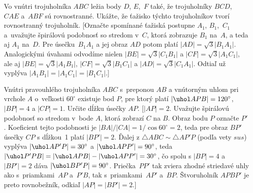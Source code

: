 {\D
Vo vnútri trojuholníka $ABC$ ležia body $D$, $E$,~$F$ také, že
trojuholníky $BCD$, $CAE$ a~$ABF$ sú rovnostranné. Ukážte, že ťažisko
týchto trojuholníkov tvorí rovnostranný trojuholník.
[Označte spomínané ťažiská postupne $A_1$, $B_1$,~$C_1$ a~uvažujte
špirálovú podobnosť so stredom v~$C$, ktorá zobrazuje $B_1$
na~$A$, a teda aj $A_1$ na~$D$. Pre úsečku~$B_1A_1$ a
jej obraz $AD$ potom platí $|AD|=\sqrt{3}|B_1A_1|$.
Analogickými úvahami odvodíme nielen $|BE|=\sqrt{3}|C_1B_1|$
a $|CF|=\sqrt{3}|A_1C_1|$, ale aj
$|BE|=\sqrt{3}|A_1B_1|$, $|CF|=\sqrt{3}|B_1C_1|$ a
$|AD|=\sqrt{3}|C_1A_1|$. Odtiaľ už vyplýva
$|A_1B_1|=|A_1C_1|=|B_1C_1|$.]

Vnútri pravouhlého trojuholníka $ABC$ s~preponou $AB$ a
vnútorným uhlom pri vrchole $A$ o~veľkosti $60^\circ$
existuje bod $P$, pre ktorý platí $|\uhol APB| = 120^\circ$,
$|BP| = 4$ a $|CP| = 1$. Určite dĺžku úsečky $AP$.
[$|AP|=2$. Uvažujte špirálovú podobnosť so stredom v~bode $A$,
ktorá zobrazí $C$ na $B$. Obraz bodu $P$ označte $P'$.
Koeficient tejto podobnosti je
$|BA|/|CA|=1/\cos60^{\circ}=2$, teda
pre obraz $BP'$ úsečky $CP$ s dĺžkou~1 platí $|BP'| = 2$.
Ďalej z $\triangle ABC\sim\triangle AP'P$ (podľa vety
$sus$) vyplýva $|\uhol AP'P|=30^\circ$
a $|\uhol APP'|=90^\circ$, teda
$|\uhol P'PB|=|\uhol APB|-|\uhol APP'|=30^\circ$,
čo spolu s $|BP|=4$ a $|BP'|=2$
dáva $|\uhol BP'P|=90^\circ$. Priečka~$PP'$ tak zviera zhodné
striedavé uhly ako s~priamkami~$AP$ a~$P'B$, tak s~priamkami~$AP'$
a~$BP$. Štvoruholník $APBP'$ je preto rovnobežník, odkiaľ
$|AP|=|BP'|=2$.]

}

